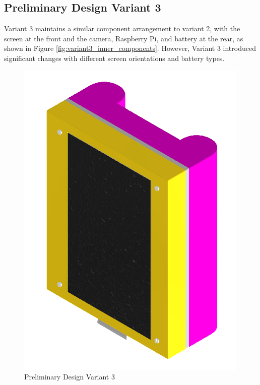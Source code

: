 \subsection{Preliminary Design Variant 3}
\label{subsec:preliminary_design_variant_3}
Variant 3 maintains a similar component arrangement to variant 2, with the screen at the front and the camera, Raspberry Pi, and battery at the rear, as shown in Figure \ref{fig:variant3_inner_components}. However, Variant 3 introduced significant changes with different screen orientations and battery types.

\begin{figure}[!ht]
    \centering
    \includegraphics[height=5 cm]{texs/Part1/chapter4/image/v31.png}
    \caption{Preliminary Design Variant 3}
    \label{fig:preliminary_design_variant_3}
\end{figure}

